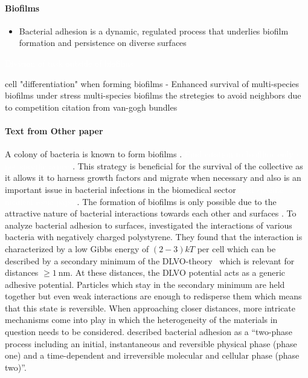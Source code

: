 \documentclass{article}
\newcommand{\todo}[1]{\colorbox{WildStrawberry}{\textcolor{white}{#1}}}
\begin{document}
\paragraph{Biofilms}
\begin{itemize}
    \item \cite{Dunne2002} Bacterial adhesion is a dynamic, regulated process that underlies biofilm formation and persistence on diverse surfaces
\end{itemize}

\todo{Division of task outside of biofilms}

cell "differentiation" when forming biofilms - \cite{Lopez2010}
Enhanced survival of multi-species biofilms under stress \cite{Wisnu2022}
multi-species biofilms the stretegies to avoid neighbors due to competition \cite{Rendueles2012}
\cite{Li2025} citation from van-gogh bundles

\paragraph{Text from Other paper}
A colony of bacteria is known to form biofilms \cite{Dunne2002}. \todo{Find citation to biofilms only - not specific aspect}. This strategy is beneficial for the
survival of the collective as it allows it to harness growth factors and migrate when necessary and
also is an important issue in bacterial infections in the biomedical sector~\cite{Ong1999}\todo{add specific medical issue paper}.
The formation of biofilms is only possible due to the attractive nature of bacterial interactions
towards each other and surfaces \cite{Berne2018}. To analyze bacterial adhesion to surfaces,
\cite{vanLoosdrecht1989} investigated the interactions of various bacteria with negatively charged
polystyrene.
They found that the interaction is characterized by a low Gibbs energy of $(2 - 3)kT$ per cell
which can be described by a secondary minimum of the DLVO-theory~\cite{Verwey1947,Derjaguin1993}
which is relevant for distances $\geq\SI{1}{\nano\meter}$.
At these distances, the DLVO potential acts as a generic adhesive potential.
Particles which stay in the secondary minimum are held together but even weak interactions are
enough to redisperse them which means that this state is reversible.
When approaching closer distances, more intricate mechanisms come into play in which the
heterogeneity of the materials in question needs to be considered.
\cite{Hori2010} described bacterial adhesion as a “two-phase process including an initial,
instantaneous and reversible physical phase (phase one) and a time-dependent and irreversible
molecular and cellular phase (phase two)”.
\end{document}
